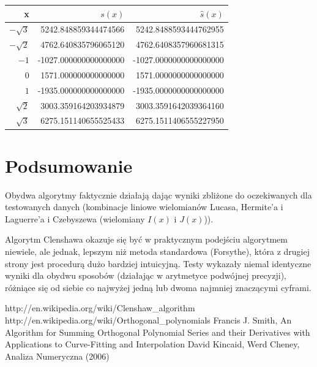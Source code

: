 \documentclass[11pt,leqno]{article}
\begin{document}
\begin{center}
\begin{tabular}{ r || r | r }
  \hline
  x & $s(x)$ & $\hat{s}(x)$ \\
  \hline \hline
  $-\sqrt{3}$ &  5242.848859344474566 &  5242.8488593444762955 \\
  $-\sqrt{2}$ &  4762.640835796065120 &  4762.6408357960681315 \\
  $-1$        & -1027.000000000000000 & -1027.0000000000000000 \\
  $0$         &  1571.000000000000000 &  1571.0000000000000000 \\
  $1$         & -1935.000000000000000 & -1935.0000000000000000 \\
  $\sqrt{2}$  &  3003.359164203934879 &  3003.3591642039364160 \\
  $\sqrt{3}$  &  6275.151140655525433 &  6275.1511406555227950 \\
\end{tabular}
\end{center}



\section{Podsumowanie}

Obydwa algorytmy faktycznie działają dając wyniki zbliżone do oczekiwanych dla testowanych danych (kombinacje liniowe wielomianów Lucasa, Hermite'a i Laguerre'a i Czebyszewa (wielomiany $I(x)$ i $J(x)$)).

Algorytm Clenshawa okazuje się być w praktycznym podejściu algorytmem niewiele, ale jednak, lepszym niż metoda standardowa (Forsythe), która z drugiej strony jest procedurą dużo bardziej intuicyjną. Testy wykazały niemal identyczne wyniki dla obydwu sposobów (działając w arytmetyce podwójnej precyzji), różniące się od siebie co najwyżej jedną lub dwoma najmniej znaczącymi cyframi.


\begin{thebibliography}{99}
 http://en.wikipedia.org/wiki/Clenshaw\_algorithm
 http://en.wikipedia.org/wiki/Orthogonal\_polynomials
 Francis J. Smith, An Algorithm for Summing Orthogonal Polynomial Series and their Derivatives with Applications to Curve-Fitting and Interpolation
 David Kincaid, Werd Cheney, Analiza Numeryczna (2006)
\end{thebibliography}
\end{document}
